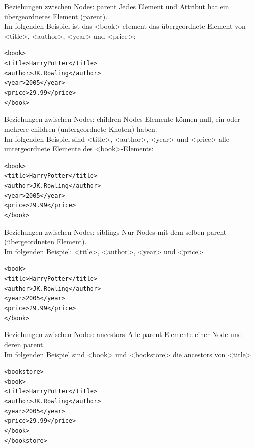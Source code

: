 \documentclass[xcolor=dvipsnames]{beamer}\usepackage[]{graphicx}\usepackage[]{color}
\makeatletter
\newenvironment{kframe}{%
 \def\at@end@of@kframe{}%
 \ifinner\ifhmode%
  \def\at@end@of@kframe{\end{minipage}}%
  \begin{minipage}{\columnwidth}%
 \fi\fi%
 \def\FrameCommand##1{\hskip\@totalleftmargin \hskip-\fboxsep
 \colorbox{shadecolor}{##1}\hskip-\fboxsep
     \hskip-\linewidth \hskip-\@totalleftmargin \hskip\columnwidth}%
 \MakeFramed {\advance\hsize-\width
   \@totalleftmargin\z@ \linewidth\hsize
   \@setminipage}}%
 {\par\unskip\endMakeFramed%
 \at@end@of@kframe}
\makeatother
\begin{document}
\begin{frame}[fragile]{Beziehungen zwischen Nodes: parent}
Jedes Element und Attribut hat ein übergeordnetes Element (parent).\\
Im folgenden Beispiel ist das <book> element das übergeordnete Element von <title>, <author>, <year> und <price>:
\begin{kframe}
\begin{alltt}
<book>
  <title>Harry Potter</title>
  <author>J K. Rowling</author>
  <year>2005</year>
  <price>29.99</price>
</book>
\end{alltt}
\end{kframe}
\end{frame}


\begin{frame}[fragile]{Beziehungen zwischen Nodes: children}
Nodes-Elemente können null, ein oder mehrere children (untergeordnete Knoten) haben. \\
Im folgenden Beispiel sind <title>, <author>, <year> und <price> alle untergeordnete Elemente des <book>-Elements:
\begin{kframe}
\begin{alltt}
<book>
  <title>Harry Potter</title>
  <author>J K. Rowling</author>
  <year>2005</year>
  <price>29.99</price>
</book>
\end{alltt}
\end{kframe}
\end{frame}


\begin{frame}[fragile]{Beziehungen zwischen Nodes: siblings}
Nur Nodes mit dem selben parent (übergeordneten Element). \\
Im folgenden Beispiel: <title>, <author>, <year> und <price>
\begin{kframe}
\begin{alltt}
<book>
  <title>Harry Potter</title>
  <author>J K. Rowling</author>
  <year>2005</year>
  <price>29.99</price>
</book>
\end{alltt}
\end{kframe}
\end{frame}


\begin{frame}[fragile]{Beziehungen zwischen Nodes: ancestors}
Alle parent-Elemente einer Node und deren parent. \\
Im folgenden Beispiel sind <book> und <bookstore> die ancestors von <title>
\begin{kframe}
\begin{alltt}
<bookstore>
  <book>
    <title>Harry Potter</title>
    <author>J K. Rowling</author>
    <year>2005</year>
    <price>29.99</price>
  </book>
</bookstore>
\end{alltt}
\end{kframe}
\end{frame}
\end{document}
